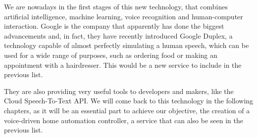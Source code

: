 We are nowadays in the first stages of this new technology, that combines artificial intelligence, machine learning, voice recognition
and human-computer interaction. Google is the company that apparently has done the biggest advancements and, in fact, they have
recently introduced Google Duplex, a technology capable of almost perfectly simulating a human speech, which can be used for a wide
range of purposes, such as ordering food or making an appointment with a hairdresser. This would be a new service to include in
the previous list.

They are also providing very useful tools to developers and makers, like the Cloud Speech-To-Text API. We will come back to this
technology in the following chapters, as it will be an essential part to achieve our objective, the creation of a voice-driven home
automation controller, a service that can also be seen in the previous list.
